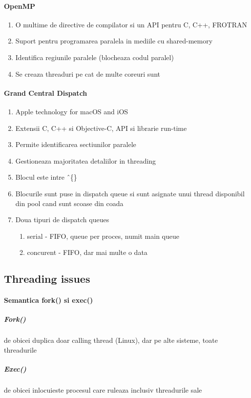 \documentclass{article}
\begin{document}
\paragraph*{OpenMP}
\begin{enumerate}
    \item O multime de directive de compilator si un API pentru C, C++, FROTRAN
    \item Suport pentru programarea paralela in mediile cu shared-memory
    \item Identifica regiunile paralele (blocheaza codul paralel)
    \item Se creaza threaduri pe cat de multe coreuri sunt
\end{enumerate}

\paragraph*{Grand Central Dispatch}
\begin{enumerate}
    \item Apple technology for macOS and iOS
    \item Extensii C, C++ si Objective-C, API si librarie run-time
    \item Permite identificarea sectiunilor paralele
    \item Gestioneaza majoritatea detaliilor in threading
    \item Blocul este intre \^\ \{\}
    \item Blocurile sunt puse in dispatch queue si sunt asignate unui thread disponibil din pool cand sunt scoase din coada
    \item Doua tipuri de dispatch queues
          \begin{enumerate}
              \item serial - FIFO, queue per proces, numit main queue
              \item concurent - FIFO, dar mai multe o data
          \end{enumerate}
\end{enumerate}

\subsection*{Threading issues}
\paragraph*{Semantica fork() si exec()}
\subparagraph*{Fork()} de obicei duplica doar calling thread (Linux), dar pe alte sisteme, toate threadurile
\subparagraph*{Exec()} de obicei inlocuieste procesul care ruleaza inclusiv threadurile sale
\end{document}
